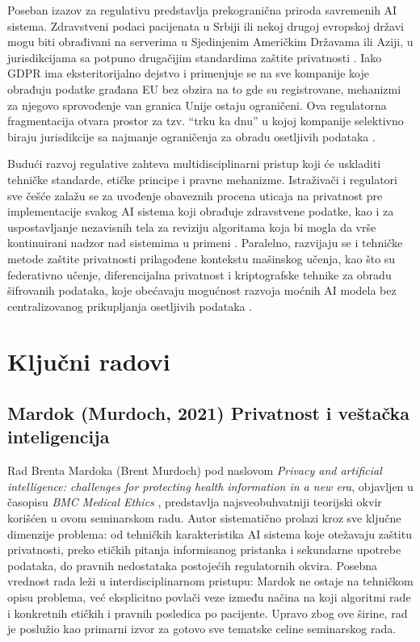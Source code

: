 \documentclass[12pt]{article}
\begin{document}
Poseban izazov za regulativu predstavlja prekogranična priroda savremenih 
AI sistema. Zdravstveni podaci pacijenata u Srbiji ili nekoj drugoj evropskoj državi mogu biti obrađivani na serverima u Sjedinjenim Američkim Državama ili Aziji, u jurisdikcijama sa potpuno drugačijim standardima zaštite privatnosti \cite{abouelmehdi2017}. Iako GDPR ima eksteritorijalno dejstvo i primenjuje se na sve kompanije koje obrađuju podatke građana EU bez obzira na to gde su registrovane, mehanizmi za njegovo sprovođenje van granica Unije ostaju ograničeni. Ova regulatorna fragmentacija otvara prostor za tzv. ``trku ka dnu'' u kojoj kompanije selektivno biraju jurisdikcije sa najmanje ograničenja 
za obradu osetljivih podataka \cite{murdoch2021}.
 
Budući razvoj regulative zahteva multidisciplinarni pristup koji će uskladiti tehničke standarde, etičke principe i pravne mehanizme. Istraživači i regulatori sve češće zalažu se za uvođenje obaveznih procena uticaja na privatnost pre implementacije svakog AI 
sistema koji obrađuje zdravstvene podatke, kao i za uspostavljanje nezavisnih tela za reviziju algoritama koja bi mogla da vrše kontinuirani nadzor nad sistemima u primeni \cite{kumar2025}. Paralelno, razvijaju se i tehničke metode zaštite privatnosti prilagođene kontekstu mašinskog učenja, kao što su federativno učenje, diferencijalna privatnost i kriptografske tehnike za obradu šifrovanih podataka, koje obećavaju mogućnost razvoja moćnih AI modela bez centralizovanog prikupljanja osetljivih podataka \cite{abouelmehdi2017}.
\newpage
\section{Ključni radovi}
 
\subsection{Mardok (Murdoch, 2021) Privatnost i veštačka inteligencija}
 
Rad Brenta Mardoka (Brent Murdoch) pod naslovom \textit{Privacy and artificial intelligence: challenges for protecting health information in a new era}, objavljen u časopisu \textit{BMC Medical Ethics} \cite{murdoch2021}, predstavlja najsveobuhvatniji teorijski okvir korišćen u ovom seminarskom radu. Autor sistematično prolazi kroz sve ključne dimenzije problema: od tehničkih karakteristika AI sistema koje otežavaju zaštitu privatnosti, preko etičkih pitanja informisanog pristanka i sekundarne upotrebe podataka, do pravnih nedostataka postojećih regulatornih okvira. Posebna vrednost rada leži u interdisciplinarnom pristupu: Mardok ne ostaje na tehničkom opisu problema, već eksplicitno povlači veze između načina na koji algoritmi rade i konkretnih etičkih i pravnih posledica po pacijente. Upravo zbog ove širine, rad je poslužio kao primarni izvor za gotovo sve tematske celine seminarskog rada.
 
\end{document}
